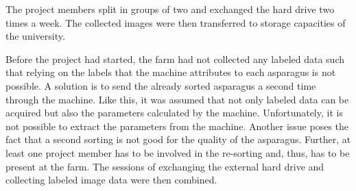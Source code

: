 \bigskip
The project members split in groups of two and exchanged the hard drive two times a week. The collected images were then transferred to storage capacities of the university.

Before the project had started, the farm had not collected any labeled data such that relying on the labels that the machine attributes to each asparagus is not possible. A solution is to send the already sorted asparagus a second time through the machine. Like this, it was assumed that not only labeled data can be acquired but also the parameters calculated by the machine. Unfortunately, it is not possible to extract the parameters from the machine. Another issue poses the fact that a second sorting is not good for the quality of the asparagus. Further, at least one project member has to be involved in the re-sorting and, thus, has to be present at the farm. The sessions of exchanging the external hard drive and collecting labeled image data were then combined.

